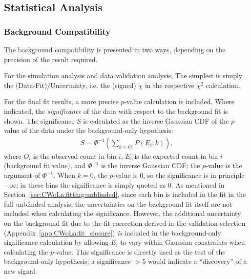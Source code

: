 \subsection{Statistical Analysis}
\label{sec:CWoLa:statanalysis}

\subsubsection{Background Compatibility}
The background compatibility is presented in two ways, depending on the precision of the result required.

For the simulation analysis and data validation analysis, The simplest is simply the (Data-Fit)/Uncertainty, i.e. the (signed) $\chi$ in the respective $\chi^2$ calculation.

For the final fit results, a more precise $p$-value calculation is included.
Where indicated, the \textit{significance} of the data with respect to the background fit is shown.
The significance $S$ is calculated as the inverse Gaussian CDF of the $p$-value of the data under the background-only hypothesis:
\begin{align}
  S = \Phi^{-1}\left(\sum_{k<O_i} P(E_i;k)\right),
  \label{eqn:CWoLa:significance_def}
\end{align}
where $O_i$ is the observed count in bin $i$, $E_i$ is the expected count in bin $i$ (background fit value), and $\Phi^{-1}$ is the inverse Gaussian CDF; the $p$-value is the argument of $\Phi^{-1}$.
When $k=0$, the $p$-value is $0$, so the significance is in principle $-\infty$; in these bins the significance is simply quoted as $0$.
As mentioned in Section~\ref{sec:CWoLa:fitting:unblinded}, since each bin is included in the fit in the full unblinded analysis, the uncertainties on the background fit itself are not included when calculating the significance.
However, the additional uncertainty on the background fit due to the fit correction derived in the validation selection (Appendix~\ref{app:CWoLa:fit_closure}) \textit{is} included in the background-only significance calculation by allowing $E_i$ to vary within Gaussian constraints when calculating the $p$-value.
This significance is directly used as the test of the background-only hypothesis; a significance $>5$ would indicate a ``discovery'' of a new signal.

